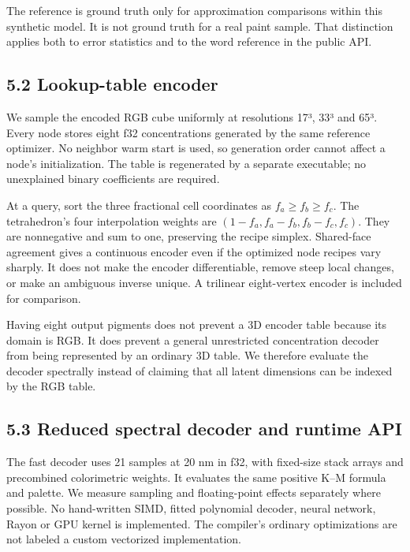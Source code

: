 \documentclass[
  10pt,
  twocolumn]{article}
\begin{document}
The reference is ground truth only for approximation comparisons within
this synthetic model. It is not ground truth for a real paint sample.
That distinction applies both to error statistics and to the word
reference in the public API.

\hypertarget{lookup-table-encoder}{%
\subsection{5.2 Lookup-table encoder}\label{lookup-table-encoder}}

We sample the encoded RGB cube uniformly at resolutions 17³, 33³ and
65³. Every node stores eight f32 concentrations generated by the same
reference optimizer. No neighbor warm start is used, so generation order
cannot affect a node's initialization. The table is regenerated by a
separate executable; no unexplained binary coefficients are required.

At a query, sort the three fractional cell coordinates as
\(f_a\geq f_b\geq f_c\). The tetrahedron's four interpolation weights
are \((1-f_a,f_a-f_b,f_b-f_c,f_c)\). They are nonnegative and sum to
one, preserving the recipe simplex. Shared-face agreement gives a
continuous encoder even if the optimized node recipes vary sharply. It
does not make the encoder differentiable, remove steep local changes, or
make an ambiguous inverse unique. A trilinear eight-vertex encoder is
included for comparison.

Having eight output pigments does not prevent a 3D encoder table because
its domain is RGB. It does prevent a general unrestricted concentration
decoder from being represented by an ordinary 3D table. We therefore
evaluate the decoder spectrally instead of claiming that all latent
dimensions can be indexed by the RGB table.

\hypertarget{reduced-spectral-decoder-and-runtime-api}{%
\subsection{5.3 Reduced spectral decoder and runtime
API}\label{reduced-spectral-decoder-and-runtime-api}}

The fast decoder uses 21 samples at 20 nm in f32, with fixed-size stack
arrays and precombined colorimetric weights. It evaluates the same
positive K--M formula and palette. We measure sampling and
floating-point effects separately where possible. No hand-written SIMD,
fitted polynomial decoder, neural network, Rayon or GPU kernel is
implemented. The compiler's ordinary optimizations are not labeled a
custom vectorized implementation.
\end{document}
